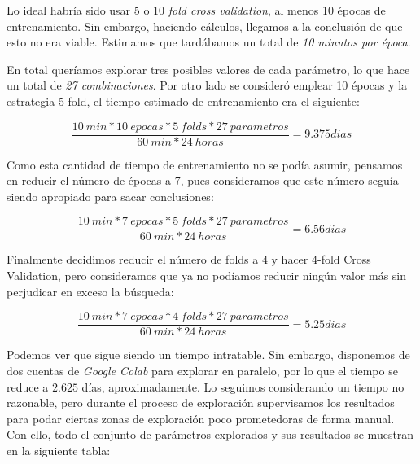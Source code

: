 \documentclass[11pt]{article}
\begin{document}
Lo ideal habría sido usar 5 o 10 \emph{fold cross validation}, al menos 10 épocas de entrenamiento. Sin embargo, haciendo cálculos, llegamos a la conclusión de que esto no era viable. Estimamos que tardábamos  un total de \emph{10 minutos por época}.

En total queríamos explorar tres posibles valores de cada parámetro, lo que hace un total de \emph{27 combinaciones}. Por otro lado se consideró emplear 10 épocas y la estrategia 5-fold, el tiempo estimado de entrenamiento era el siguiente:

$$\frac{10 \:  min * 10 \: epocas * 5 \: folds * 27 \: parametros}{60 \: min * 24 \: horas} = 9.375 dias$$

Como esta cantidad de tiempo de entrenamiento no se podía asumir, pensamos en reducir el número de épocas a 7, pues consideramos que este número seguía siendo apropiado para sacar conclusiones:

$$\frac{10 \:  min * 7 \: epocas * 5 \: folds * 27 \: parametros}{60 \: min * 24 \: horas} = 6.56 dias$$

Finalmente decidimos reducir el número de folds a 4 y hacer 4-fold Cross Validation, pero consideramos que ya no podíamos reducir ningún valor más sin perjudicar en exceso la búsqueda:

$$\frac{10 \:  min * 7 \: epocas * 4 \: folds * 27 \: parametros}{60 \: min * 24 \: horas} = 5.25 dias$$

Podemos ver que sigue siendo un tiempo intratable. Sin embargo, disponemos de dos cuentas de \emph{Google Colab} para explorar en paralelo, por lo que el tiempo se reduce a $2.625$ días, aproximadamente. Lo seguimos considerando un tiempo no razonable, pero durante el proceso de exploración supervisamos los resultados para podar ciertas zonas de exploración poco prometedoras de forma manual. Con ello, todo el conjunto de parámetros explorados y sus resultados se muestran en la siguiente tabla:
\end{document}
